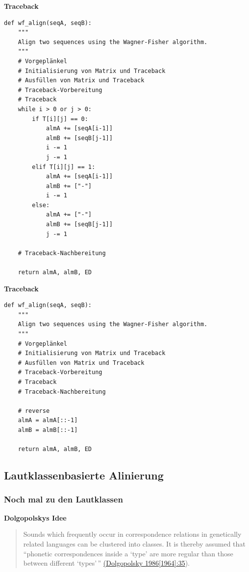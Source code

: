 \par\noindent\textbf{Traceback}

\begin{verbatim}
def wf_align(seqA, seqB):
    """
    Align two sequences using the Wagner-Fisher algorithm.
    """
    # Vorgeplänkel
    # Initialisierung von Matrix und Traceback
    # Ausfüllen von Matrix und Traceback
    # Traceback-Vorbereitung
    # Traceback
    while i > 0 or j > 0:
        if T[i][j] == 0:
            almA += [seqA[i-1]]
            almB += [seqB[j-1]]
            i -= 1
            j -= 1
        elif T[i][j] == 1:
            almA += [seqA[i-1]]
            almB += ["-"]
            i -= 1
        else:
            almA += ["-"]
            almB += [seqB[j-1]]
            j -= 1

    # Traceback-Nachbereitung

    return almA, almB, ED
\end{verbatim}




\par\noindent\textbf{Traceback}

\begin{verbatim}
def wf_align(seqA, seqB):
    """
    Align two sequences using the Wagner-Fisher algorithm.
    """
    # Vorgeplänkel
    # Initialisierung von Matrix und Traceback
    # Ausfüllen von Matrix und Traceback
    # Traceback-Vorbereitung
    # Traceback
    # Traceback-Nachbereitung

    # reverse
    almA = almA[::-1]
    almB = almB[::-1]

    return almA, almB, ED
\end{verbatim}

\subsection{Lautklassenbasierte Alinierung}

\subsubsection{\texorpdfstring{{Noch mal zu den
Lautklassen}}{Noch mal zu den Lautklassen}}

\par\noindent\textbf{Dolgopolskys Idee}

\begin{quote}
Sounds which frequently occur in correspondence relations in genetically
related languages can be clustered into classes. It is thereby assumed
that ``phonetic correspondences inside a `type' are more regular than
those between different `types'\,''
\href{http://bibliography.lingpy.org?key=Dolgopolsky1986}{(Dolgopolsky
1986{[}1964{]}:35}).
\end{quote}




